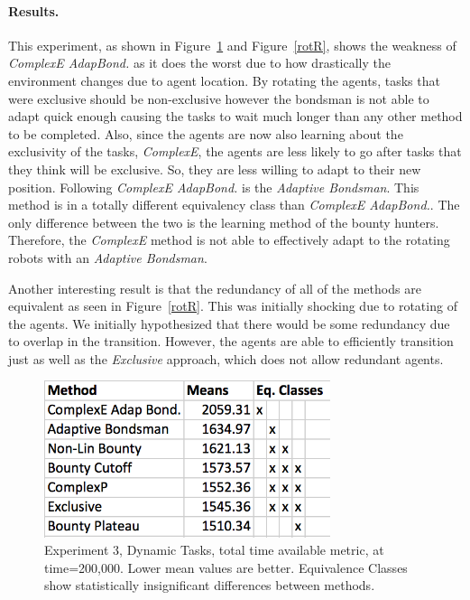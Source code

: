 \documentclass[letterpaper]{aamas2015}
\newcommand\paragrapha[1]{\paragraph*{{#1}.}}
\newcommand\bump{\vspace{10in}}
\begin{document}
\paragrapha{Results}
This experiment, as shown in Figure~\ref{rotT} and Figure~\ref{rotR}, shows the weakness of \textit{ComplexE AdapBond.} as it does the worst due to how drastically the environment changes due to agent location.  By rotating the agents, tasks that were exclusive should be non-exclusive however the bondsman is not able to adapt quick enough causing the tasks to wait much longer than any other method to be completed. Also, since the agents are now also learning about the exclusivity of the tasks, \textit{ComplexE}, the agents are less likely to go after tasks that they think will be exclusive.  So, they are less willing to adapt to their new position. Following \textit{ComplexE AdapBond.} is the \textit{Adaptive Bondsman}.  This method is in a totally different equivalency class than \textit{ComplexE AdapBond.}.  The only difference between the two is the learning method of the bounty hunters.  Therefore, the \textit{ComplexE} method is not able to effectively adapt to the rotating robots with an \textit{Adaptive Bondsman}.

Another interesting result is that the redundancy of all of the methods are equivalent as seen in Figure~\ref{rotR}.  This was initially shocking due to rotating of the agents.  We initially hypothesized that there would be some redundancy due to overlap in the transition.  However, the agents are able to efficiently transition just as well as the \textit{Exclusive} approach, which does not allow redundant agents.



\begin{figure}[t]
\begin{center}\includegraphics[width=3.3in]{rotT.png}\end{center}
\vspace{-0.5em}\caption{Experiment 3, Dynamic Tasks, total time available metric, at time=200,000.  Lower mean values are better.  Equivalence Classes show statistically insignificant differences between methods.}
\label{rotT}
\end{figure}
\end{document}
